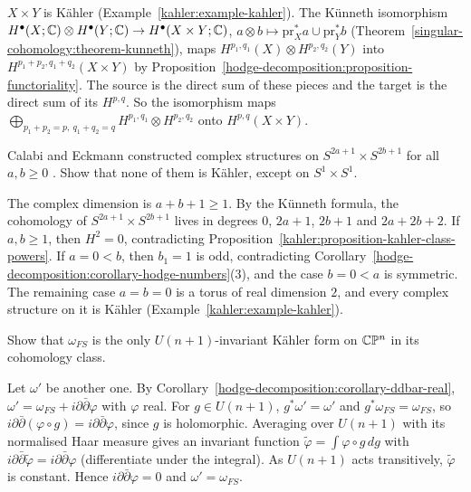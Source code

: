 \begin{solution}
$X \times Y$ is K\"ahler (Example~\ref{kahler:example-kahler}). The K\"unneth isomorphism
$H^\bullet(X; \mathbb{C}) \otimes H^\bullet(Y; \mathbb{C}) \to H^\bullet(X \times Y; \mathbb{C})$, $a \otimes b \mapsto \mathrm{pr}_X^*a \cup \mathrm{pr}_Y^*b$
(Theorem~\ref{singular-cohomology:theorem-kunneth}), maps $H^{p_1,q_1}(X) \otimes H^{p_2,q_2}(Y)$ into $H^{p_1+p_2,q_1+q_2}(X \times Y)$ by
Proposition~\ref{hodge-decomposition:proposition-functoriality}. The source is the direct sum of these pieces and the target is the direct
sum of its $H^{p,q}$. So the isomorphism maps $\bigoplus_{p_1+p_2=p,\ q_1+q_2=q}H^{p_1,q_1} \otimes H^{p_2,q_2}$ onto $H^{p,q}(X \times Y)$.
\end{solution}

\begin{exercise}\label{hodge-decomposition:exercise-calabi-eckmann}
Calabi and Eckmann constructed complex structures on $S^{2a+1} \times S^{2b+1}$ for all $a, b \geq 0$ \cite{calabi-eckmann}. Show that none
of them is K\"ahler, except on $S^1 \times S^1$.
\end{exercise}

\begin{solution}
The complex dimension is $a + b + 1 \geq 1$. By the K\"unneth formula, the cohomology of $S^{2a+1} \times S^{2b+1}$ lives in degrees
$0$, $2a + 1$, $2b + 1$ and $2a + 2b + 2$. If $a, b \geq 1$, then $H^2 = 0$, contradicting
Proposition~\ref{kahler:proposition-kahler-class-powers}. If $a = 0 < b$, then $b_1 = 1$ is odd, contradicting
Corollary~\ref{hodge-decomposition:corollary-hodge-numbers}(3), and the case $b = 0 < a$ is symmetric. The remaining case $a = b = 0$ is a
torus of real dimension $2$, and every complex structure on it is K\"ahler (Example~\ref{kahler:example-kahler}).
\end{solution}

\begin{exercise}\label{hodge-decomposition:exercise-invariant-fubini-study}
Show that $\omega_{FS}$ is the only $U(n+1)$-invariant K\"ahler form on $\mathbb{C}\mathbb{P}^n$ in its cohomology class.
\end{exercise}

\begin{solution}
Let $\omega'$ be another one. By Corollary~\ref{hodge-decomposition:corollary-ddbar-real}, $\omega' = \omega_{FS} + i\partial\bar\partial\varphi$
with $\varphi$ real. For $g \in U(n+1)$, $g^*\omega' = \omega'$ and $g^*\omega_{FS} = \omega_{FS}$, so $i\partial\bar\partial(\varphi \circ g) = i\partial\bar\partial\varphi$,
since $g$ is holomorphic. Averaging over $U(n+1)$ with its normalised Haar measure gives an invariant function
$\tilde\varphi = \int\varphi \circ g\,dg$ with $i\partial\bar\partial\tilde\varphi = i\partial\bar\partial\varphi$ (differentiate under the integral). As
$U(n+1)$ acts transitively, $\tilde\varphi$ is constant. Hence $i\partial\bar\partial\varphi = 0$ and $\omega' = \omega_{FS}$.
\end{solution}

